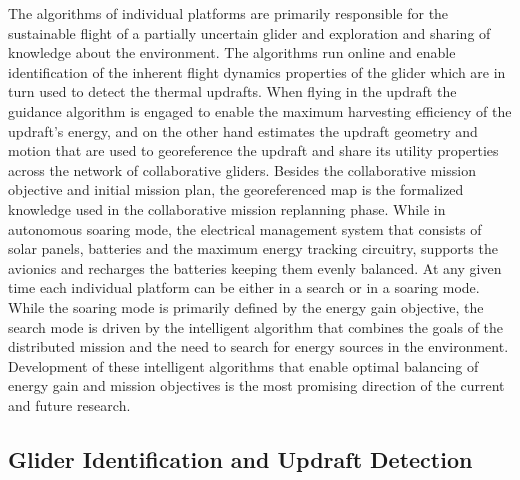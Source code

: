 \documentclass{ifacconf}
\begin{document}
The algorithms of individual platforms are primarily responsible for the sustainable flight of a partially uncertain glider and exploration and sharing of knowledge about the environment. The algorithms run online and enable identification of the inherent flight dynamics properties of the glider which are in turn used to detect the thermal updrafts. When flying in the updraft the guidance algorithm is engaged to enable the maximum harvesting efficiency of the updraft's energy, and on the other hand estimates the updraft geometry and motion that are used to georeference the updraft and share its utility properties across the network of collaborative gliders. Besides the collaborative mission objective and initial mission plan, the georeferenced map is the formalized knowledge used in the collaborative mission replanning phase. While in autonomous soaring mode, the electrical management system that consists of solar panels, batteries and the maximum energy tracking circuitry, supports the avionics and recharges the batteries keeping them evenly balanced. At any given time each individual platform can be either in a search or in a soaring mode. While the soaring mode is primarily defined by the energy gain objective, the search mode is driven by the intelligent algorithm that combines the goals of the distributed mission and the need to search for energy sources in the environment. Development of these intelligent algorithms that enable optimal balancing of energy gain and mission objectives is the most promising direction of the current and future research.

\subsection{Glider Identification and Updraft Detection}
\label{subsec:SysID}
\end{document}
